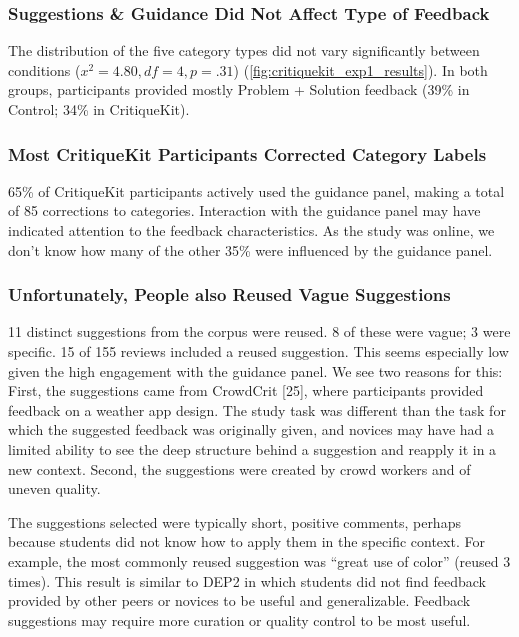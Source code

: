 \subsubsection{Suggestions \& Guidance Did Not Affect Type of Feedback}
The distribution of the five category types did not vary significantly between conditions ($x^2 = 4.80, df = 4, p = .31$) (\autoref{fig:critiquekit_exp1_results}). In both groups, participants provided mostly Problem + Solution feedback (39\% in Control; 34\% in CritiqueKit). 

\subsubsection{Most CritiqueKit Participants Corrected Category Labels}
65\% of CritiqueKit participants actively used the guidance panel, making a total of 85 corrections to categories. Interaction with the guidance panel may have indicated attention to the feedback characteristics. As the study was online, we don't know how many of the other 35\% were influenced by the guidance panel. 

\subsubsection{Unfortunately, People also Reused Vague Suggestions}
11 distinct suggestions from the corpus were reused. 8 of these were vague; 3 were specific. 15 of 155 reviews included a reused suggestion. This seems especially low given the high engagement with the guidance panel. We see two reasons for this: First, the suggestions came from CrowdCrit [25], where participants provided feedback on a weather app design. The study task was different than the task for which the suggested feedback was originally given, and novices may have had a limited ability to see the deep structure behind a suggestion and reapply it in a new context. Second, the suggestions were created by crowd workers and of uneven quality. 

The suggestions selected were typically short, positive comments, perhaps because students did not know how to apply them in the specific context. For example, the most commonly reused suggestion was ``great use of color'' (reused 3 times). This result is similar to DEP2 in which students did not find feedback provided by other peers or novices to be useful and generalizable. Feedback suggestions may require more curation or quality control to be most useful. 

